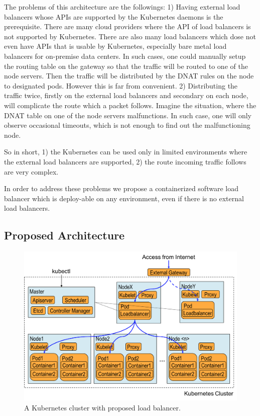 The problems of this architecture are the followings: 
1) Having external load balancers whose APIs are supported by the Kubernetes daemons is the prerequisite. 
There are many cloud providers where the API of load balancers is not supported by Kubernetes. 
There are also many load balancers which dose not even have APIs that is usable by Kubernetes, 
especially bare metal load balancers for on-premise data centers.  
In such cases, one could manually setup the routing table on the gateway so that the traffic will be routed to one of the node servers.
Then the traffic will be distributed by the DNAT rules on the node to designated pods.
However this is far from convenient.
2) Distributing the traffic twice, firstly on the external load balancers and secondary on each node, 
will complicate the route which a packet follows. 
Imagine the situation, where the DNAT table on one of the node servers malfunctions.
In such case, one will only observe occasional timeouts, which is not enough to find out the malfunctioning node.   

So in short, 1) the Kubernetes can be used only in limited environments where the external load balancers are supported, 
2) the route incoming traffic follows are very complex.

In order to address these problems we propose a containerized software load balancer 
which is deploy-able on any environment, even if there is no external load balancers.

\subsection{Proposed Architecture}

\begin{figure}
\includegraphics[width=\columnwidth]{Figs/K8sProposed}
\caption{A Kubernetes cluster with proposed load balancer.}
\label{fig:K8sProposed}
\end{figure}

